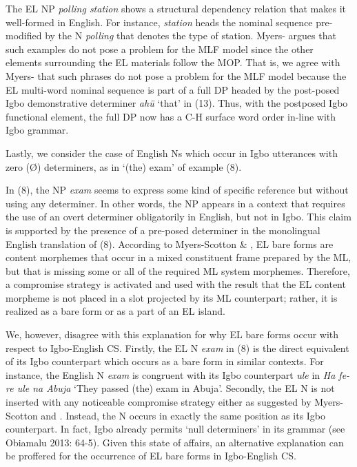 \documentclass[output=paper]{langsci/langscibook}
\begin{document}
The EL NP \textit{polling station}\textbf{\textit{ }}shows a structural dependency relation that makes it well-formed in English. For instance, \textit{station }heads the nominal sequence pre-modified by the N \textit{polling }that denotes the type of station. Myers-\citet{Scotton2002} argues that such examples do not pose a problem for the MLF model since the other elements surrounding the EL materials follow the MOP. That is, we agree with Myers-\citet[139]{Scotton2002} that such phrases do not pose a problem for the MLF model because the EL multi-word nominal sequence is part of a full DP headed by the post-posed Igbo demonstrative determiner \textit{ahü} ‘that’ in (13). Thus, with the postposed Igbo functional element, the full DP now has a C-H surface word order in-line with Igbo grammar. 

Lastly, we consider the case of English Ns which occur in Igbo utterances with zero (Ø) determiners, as in ‘(the) exam’ of example (8). 

In (8), the NP \textit{exam }seems to express some kind of specific reference but without using any determiner. In other words, the NP appears in a context that requires the use of an overt determiner obligatorily in English, but not in Igbo. This claim is supported by the presence of a pre-posed determiner in the monolingual English translation of (8). According to Myers-Scotton \& \citet[106]{Jake2001}, EL bare forms are content morphemes that occur in a mixed constituent frame prepared by the ML, but that is missing some or all of the required ML system morphemes. Therefore, a compromise strategy is activated and used with the result that the EL content morpheme is not placed in a slot projected by its ML counterpart; rather, it is realized as a bare form or as a part of an EL island. 

We, however, disagree with this explanation for why EL bare forms occur with respect to Igbo-English CS. Firstly, the EL N \textit{exam }in (8) is the direct equivalent of its Igbo counterpart which occurs as a bare form in similar contexts. For instance, the English N \textit{exam }is congruent with its Igbo counterpart \textit{ule }in \textit{Ha fe-re ule na Abuja} ‘They passed (the) exam in Abuja’. Secondly, the EL N is not inserted with any noticeable compromise strategy either as suggested by Myers-Scotton and \citet[106]{Jake2001}. Instead, the N occurs in exactly the same position as its Igbo counterpart. In fact, Igbo already permits ‘null determiners’ in its grammar (see Obiamalu 2013: 64-5). Given this state of affairs, an alternative explanation can be proffered for the occurrence of EL bare forms in Igbo-English CS. 
\end{document}

